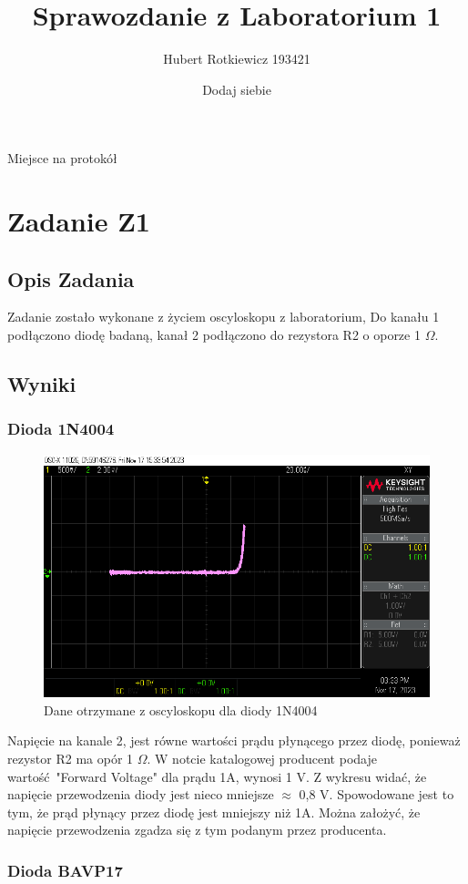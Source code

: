 \documentclass{article}
\title{Sprawozdanie z Laboratorium 1}
\author{
  Hubert Rotkiewicz 193421 \and 
Dodaj siebie
}
\begin{document}
Miejsce na protokół
\maketitle
\section{Zadanie Z1}
\subsection{Opis Zadania}
\centering
Zadanie zostało wykonane z życiem oscyloskopu z laboratorium, Do kanału 1 podłączono diodę badaną,
kanał 2 podłączono do rezystora R2 o oporze 1 $\Omega$. 
\raggedright
\subsection{Wyniki}
\subsubsection{Dioda 1N4004}
\centering
\begin{figure}[h]
\centering
\includegraphics[scale=0.35]{./img/scope_0.png}
  \caption{Dane otrzymane z oscyloskopu dla diody 1N4004}
\end{figure}
Napięcie na kanale 2, jest równe wartości prądu płynącego przez diodę, ponieważ rezystor R2 ma opór 1 $\Omega$.
W notcie katalogowej producent podaje wartość "Forward Voltage" dla prądu 1A, wynosi 1 V. Z wykresu widać, że napięcie 
przewodzenia diody jest nieco mniejsze $\approx$ 0,8 V. Spowodowane jest to tym, że prąd płynący przez diodę jest mniejszy niż 1A. Można założyć, że napięcie przewodzenia zgadza się z tym podanym przez producenta.
\raggedright
\subsubsection{Dioda BAVP17}
\centering
\end{document}
